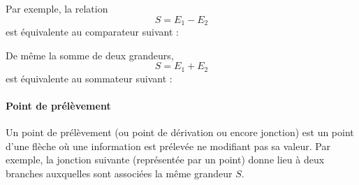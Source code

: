Par exemple, la relation 
$$
S = E_1-E_2 
$$
est équivalente au comparateur suivant :
\begin{center}
\end{center}

De même la somme de deux grandeurs,
$$                                                                                                                            
S = E_1+E_2                                                                                                          
$$
est équivalente au sommateur suivant :
\begin{center}
\end{center}

\paragraph{Point de prélèvement}

Un point de prélèvement (ou point de dérivation ou encore jonction) 
est un point d'une flèche où une information est prélevée ne modifiant pas sa valeur.
Par exemple, la jonction suivante (représentée par un point) donne lieu à deux branches auxquelles sont
associées la même grandeur $S$.

\begin{center}
\end{center}


